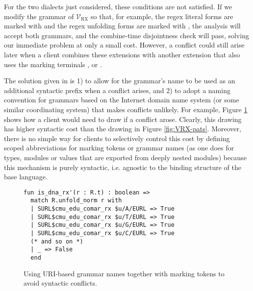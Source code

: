 {For the two dialects just considered, these conditions are not satisfied. If we modify the grammar of $\mathcal{V}_\text{RX}$ so that, for example, the regex literal forms are marked with  and the regex unfolding forms are marked with , the analysis will accept both grammars, and the combine-time disjointness check will pass, solving our immediate problem at only a small cost. However, a conflict could still  arise later when a client combines these extensions with another extension that also uses the marking terminals ,  or \li{/}. %

The solution given in \cite{conf/pldi/SchwerdfegerW09} is 1) to allow for the grammar's name to be used as an additional syntactic prefix when a conflict arises, and 2) to adopt a naming convention for grammars  based on the Internet domain name system (or some similar coordinating system) that makes conflicts unlikely. For example, Figure \ref{fig:vanwyk} shows how a client would need to draw  if a conflict arose. Clearly, this drawing has higher syntactic cost than the drawing in Figure \ref{fig:VRX-pats}. Moreover, there is no simple way for clients to selectively control this cost by defining scoped abbreviations for marking tokens or grammar names (as one does for types, modules or values that are exported from deeply nested modules) because this mechanism is purely syntactic, i.e. agnostic to the binding structure of the base language.

\begin{figure}
\begin{lstlisting}[numbers=none]
fun is_dna_rx'(r : R.t) : boolean => 
  match R.unfold_norm r with 
  | SURL$cmu_edu_comar_rx $u/A/EURL => True 
  | SURL$cmu_edu_comar_rx $u/T/EURL => True
  | SURL$cmu_edu_comar_rx $u/G/EURL => True
  | SURL$cmu_edu_comar_rx $u/C/EURL => True
  (* and so on *)
  | _ => False
  end
\end{lstlisting}
\caption{Using URI-based grammar names together with marking tokens to avoid syntactic conflicts.}
\label{fig:vanwyk}
\end{figure}

}

